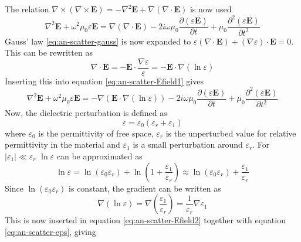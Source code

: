 \documentclass[11pt,twoside]{eitExjobb}
\begin{document}
	The relation $\nabla \times (\nabla \times \bm{E}) = -\nabla^2\bm{E} + \nabla(\nabla \cdot \bm{E})$ is now used
	\begin{equation*}
		\nabla^2\bm{E} + \omega^2 \mu_0 \varepsilon \bm{E} = \nabla(\nabla \cdot \bm{E}) - 2i\omega \mu_0 \frac{\partial (\varepsilon \bm{E})}{\partial t} + \mu_0 \frac{\partial^2 (\varepsilon \bm{E})}{\partial t^2}
		\label{eq:an-scatter-Efield1}
	\end{equation*}
	Gauss' law \eqref{eq:an-scatter-gauss} is now expanded to $\varepsilon(\nabla \cdot \bm{E}) + (\nabla \varepsilon) \cdot \bm{E} = 0$. This can be rewritten as
	\begin{equation*}
		\nabla \cdot \bm{E} = -\bm{E} \cdot \frac{\nabla \varepsilon}{\varepsilon} = -\bm{E} \cdot \nabla (\ln{\varepsilon})
	\end{equation*}
	Inserting this into equation \eqref{eq:an-scatter-Efield1} gives
	\begin{equation}
		\nabla^2\bm{E} + \omega^2 \mu_0 \varepsilon \bm{E} = -\nabla(\bm{E} \cdot \nabla (\ln{\varepsilon})) - 2i\omega \mu_0 \frac{\partial (\varepsilon \bm{E})}{\partial t} + \mu_0 \frac{\partial^2 (\varepsilon \bm{E})}{\partial t^2}
		\label{eq:an-scatter-Efield2}
	\end{equation}
	Now, the dielectric perturbation is defined as
	\begin{equation}
		\varepsilon = \varepsilon_0(\varepsilon_r + \varepsilon_1)
		\label{eq:an-scatter-eps}
	\end{equation}
	where $\varepsilon_0$ is the permittivity of free space, $\varepsilon_r$ is the unperturbed value for relative permittivity in the material and $\varepsilon_1$ is a small perturbation around $\varepsilon_r$. For $|\varepsilon_1| \ll \varepsilon_r$ $\ln{\varepsilon}$ can be approximated as
	\begin{equation*}
		\ln{\varepsilon} = \ln(\varepsilon_0 \varepsilon_r) + \ln(1 + \frac{\varepsilon_1}{\varepsilon_r}) \approx \ln(\varepsilon_0 \varepsilon_r) + \frac{\varepsilon_1}{\varepsilon_r}
	\end{equation*}
	Since $\ln(\varepsilon_0 \varepsilon_r)$ is constant, the gradient can be written as
	\begin{equation*}
	\nabla(\ln{\varepsilon}) = \nabla \left( \frac{\varepsilon_1}{\varepsilon_r} \right) = \frac{1}{\varepsilon_r} \nabla \varepsilon_1
	\end{equation*}
	This is now inserted in equation \eqref{eq:an-scatter-Efield2} together with equation \eqref{eq:an-scatter-eps}, giving
\end{document}
